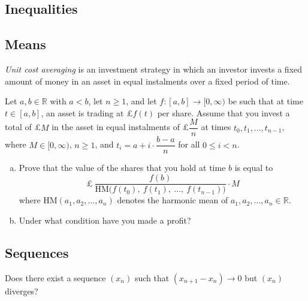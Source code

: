 \subsection*{Inequalities}

\todo{}

\subsection*{Means}

\begin{chapex}
\textit{Unit cost averaging} is an investment strategy in which an investor invests a fixed amount of money in an asset in equal instalments over a fixed period of time.

Let $a,b \in \mathbb{R}$ with $a<b$, let $n \ge 1$, and let $f : [a,b] \to [0,\infty)$ be such that at time $t \in [a,b]$, an asset is trading at £$f(t)$ per share. Assume that you invest a total of £$M$ in the asset in equal instalments of £$\dfrac{M}{n}$ at times $t_0, t_1, \dots, t_{n-1}$, where $M \in [0,\infty)$, $n \ge 1$, and $t_i = a + i \cdot \dfrac{b-a}{n}$ for all $0 \le i < n$.

\begin{enumerate}[(a)]
\item Prove that the value of the shares that you hold at time $b$ is equal to
\[ \text{£}~\dfrac{f(b)}{\mathrm{HM} \big ( f(t_0),~ f(t_1),~ \dots,~ f(t_{n-1}) \big)} \cdot M \]
where $\mathrm{HM}(a_1,a_2,\dots,a_n)$ denotes the harmonic mean of $a_1,a_2,\dots,a_n \in \mathbb{R}$.

\item Under what condition have you made a profit?
\end{enumerate}
\end{chapex}

\subsection*{Sequences}

\begin{chapex}
Does there exist a sequence $(x_n)$ such that $(x_{n+1} - x_n) \to 0$ but $(x_n)$ diverges?
\end{chapex}